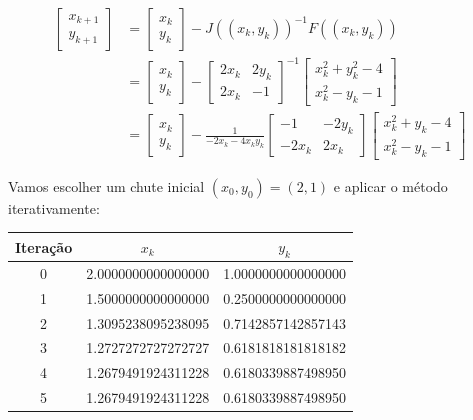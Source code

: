 \begin{align*}
    \begin{bmatrix}
        x_{k+1} \\
        y_{k+1}
    \end{bmatrix}
     & =
    \begin{bmatrix}
        x_k \\
        y_k
    \end{bmatrix} - J((x_k, y_k))^{-1} F((x_k, y_k)) \\[12pt]
     & =
    \begin{bmatrix}
        x_k \\
        y_k
    \end{bmatrix} -
    \begin{bmatrix}
        2x_k & 2y_k \\
        2x_k & -1
    \end{bmatrix}^{-1}
    \begin{bmatrix}
        x_k^2 + y_k^2 - 4 \\
        x_k^2 - y_k - 1
    \end{bmatrix}                                \\[12pt]
     & =
    \begin{bmatrix}
        x_k \\
        y_k
    \end{bmatrix} -
    \frac{1}{-2x_k - 4 x_k y_k }
    \begin{bmatrix}
        -1    & -2y_k \\
        -2x_k & 2x_k
    \end{bmatrix}
    \begin{bmatrix}
        x_k^2 + y_k - 4 \\
        x_k^2 - y_k - 1
    \end{bmatrix}
\end{align*}

Vamos escolher um chute inicial \( (x_0, y_0) = (2, 1) \) e aplicar o método
iterativamente:
\begin{center}
    \begin{tabular}{|c|c|c|}
        \hline
        Iteração & $x_k$              & $y_k$              \\
        \hline
        0        & 2.0000000000000000 & 1.0000000000000000 \\
        1        & 1.5000000000000000 & 0.2500000000000000 \\
        2        & 1.3095238095238095 & 0.7142857142857143 \\
        3        & 1.2727272727272727 & 0.6181818181818182 \\
        4        & 1.2679491924311228 & 0.6180339887498950 \\
        5        & 1.2679491924311228 & 0.6180339887498950 \\
        \hline
    \end{tabular}
\end{center}

